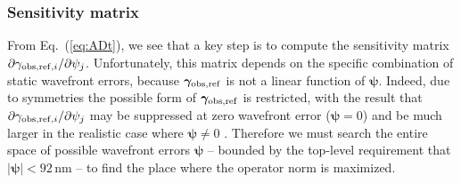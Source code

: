 \documentclass[aps,prd, amsmath,amssymb,superscriptaddress,showkeys,nofootinbib,reprint,preprintnumbers]{revtex4-1}
\begin{document}
\subsubsection{Sensitivity matrix}
\label{as:drift-sens}

From Eq.~(\ref{eq:ADt}), we see that a key step is to compute the
sensitivity matrix $\partial \gamma_{{\rm
obs,ref},i}/\partial\psi_j$. Unfortunately, this matrix depends on the
specific combination of static wavefront errors, because
${\boldsymbol\gamma}_{\rm obs,ref}$ is not a linear function of
${\boldsymbol\psi}$. Indeed, due to symmetries the possible form of
${\boldsymbol\gamma}_{\rm obs,ref}$ is restricted, with the result
that $\partial \gamma_{{\rm obs,ref},i}/\partial\psi_j$ may be
suppressed at zero wavefront error (${\boldsymbol\psi}=0$) and be much
larger in the realistic case where ${\boldsymbol\psi}\neq 0$
\citep[e.g.][]{2010SPIE.7731E..1EN}. Therefore we must search the
entire space of possible wavefront errors ${\boldsymbol\psi}$ --
bounded by the top-level requirement that $|{\boldsymbol\psi}|<92\,$nm
-- to find the place where the operator norm is maximized.
\end{document}
